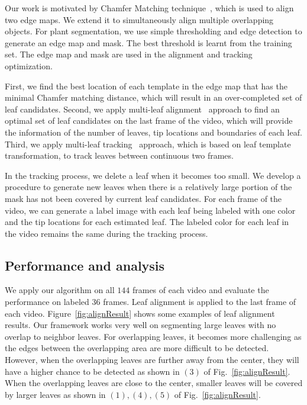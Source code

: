 Our work is motivated by Chamfer Matching technique~\cite{barrow1977parametric}, which is used to align two edge maps.
We extend it to simultaneously align multiple overlapping objects.
For plant segmentation, we use simple thresholding and edge detection to generate an edge map and mask.
The best threshold is learnt from the training set.
The edge map and mask are used in the alignment and tracking optimization. 

First, we find the best location of each template in the edge map that has the minimal Chamfer matching distance, which will result in an over-completed set of leaf candidates.
Second, we apply multi-leaf alignment~\cite{yin2014a} approach to find an optimal set of leaf candidates on the last frame of the video, which will provide the information of the number of leaves, tip locations and boundaries of each leaf.
Third, we apply multi-leaf tracking~\cite{yin2014b} approach, which is based on leaf template transformation, to track leaves between continuous two frames.

In the tracking process, we delete a leaf when it becomes too small. 
We develop a procedure to generate new leaves when there is a relatively large portion of the mask has not been covered by current leaf candidates.
For each frame of the video, we can generate a label image with each leaf being labeled with one color and the tip locations for each estimated leaf.
The labeled color for each leaf in the video remains the same during the tracking process.



\subsection{Performance and analysis}
We apply our algorithm on all $144$ frames of each video and evaluate the performance on labeled $36$ frames.
Leaf alignment is applied to the last frame of each video. 
Figure~\ref{fig:alignResult} shows some examples of leaf alignment results. 
Our framework works very well on segmenting large leaves with no overlap to neighbor leaves. 
For overlapping leaves, it becomes more challenging as the edges between the overlapping area are more difficult to be detected. 
However, when the overlapping leaves are further away from the center, they will have a higher chance to be detected as shown in $(3)$ of Fig.~\ref{fig:alignResult}. 
When the overlapping leaves are close to the center, smaller leaves will be covered by larger leaves as shown in $(1), (4), (5)$ of Fig.~\ref{fig:alignResult}.


